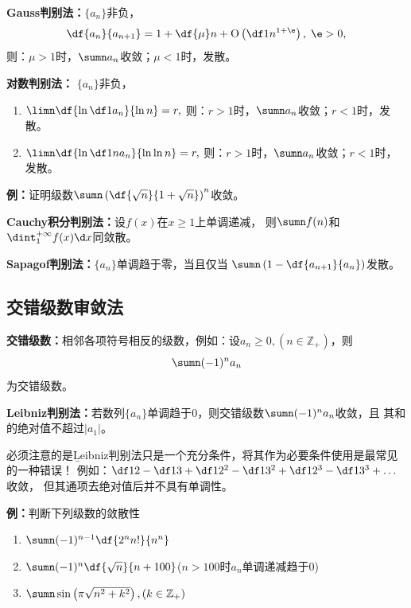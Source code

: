 \begin{shaded}
\begin{tcolorbox}
	{\bf Gauss判别法：}$\{a_n\}$非负，
	$$\df{a_n}{a_{n+1}}=1+\df{\mu}n+\mathrm{O}\left(\df1{n^{1+\e}}\right),\;\e>0,$$
	则：$\mu>1$时，$\sumn a_n$收敛；$\mu<1$时，发散。
\end{tcolorbox}

\begin{tcolorbox}
	{\bf 对数判别法：}	$\{a_n\}$非负，
	\begin{enumerate}
	  \item $\limn\df{\ln\df1{a_n}}{\ln n}=r,$
		则：$r>1$时，$\sumn a_n$收敛；$r<1$时，发散。
	  \item  $\limn\df{\ln\df1{na_n}}{\ln\ln n}=r,$
		则：$r>1$时，$\sumn a_n$收敛；$r<1$时，发散。
	\end{enumerate}	
\end{tcolorbox}

{\bf 例：}证明级数$\sumn\left(\df{\sqrt n}{1+\sqrt n}\right)^n$收敛。

\begin{tcolorbox}
	{\bf Cauchy积分判别法：}设$f(x)$在$x\geq 1$上单调递减，
	则$\sumn f(n)$和$\dint_1^{+\infty}f(x)\d x$同敛散。
\end{tcolorbox}

\begin{tcolorbox}
	{\bf Sapagof判别法：}$\{a_n\}$单调趋于零，当且仅当
	$\sumn\left(1-\df{a_{n+1}}{a_n}\right)$发散。
\end{tcolorbox}
\end{shaded}

\subsection{交错级数审敛法}

{\bf 交错级数：}相邻各项符号相反的级数，例如：设$a_n\geq 0,(n\in\mathbb{Z}_+)$，则
$$\sumn(-1)^na_n$$
为交错级数。

\begin{thx}
	{\bf Leibniz判别法：}若数列$\{a_n\}$单调趋于$0$，则交错级数$\sumn (-1)^na_n$收敛，且
	其和的绝对值不超过$|a_1|$。
\end{thx}

必须注意的是{\b Leibniz判别法只是一个充分条件，将其作为必要条件使用是最常见的一种错误！}
例如：$\df12-\df13+\df1{2^2}-\df1{3^2}+\df1{2^3}-\df1{3^3}+\ldots$收敛，
但其通项去绝对值后并不具有单调性。

{\bf 例：}判断下列级数的敛散性
\begin{enumerate} [(1)]
  \setlength{\itemindent}{1cm}
  \item $\sumn(-1)^{n-1}\df{2^nn!}{n^n}$ 
  \item $\sumn(-1)^n\df{\sqrt{n}}{n+100}$\hfill{($n>100$时$a_n$单调递减趋于$0$)}
  \item $\sumn\sin\left(\pi\sqrt{n^2+k^2}\right),(k\in\mathbb{Z}_+)$
\end{enumerate}

